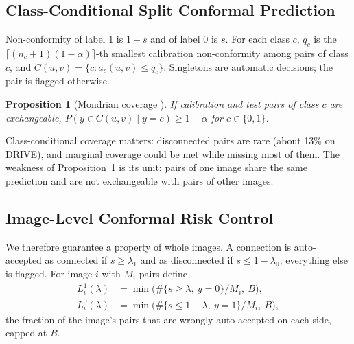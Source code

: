\documentclass[10pt,letterpaper,journal]{IEEEtran}
\newtheorem{proposition}{Proposition}
\newcommand{\1}{\mathbf{1}}
\begin{document}
\subsection{Class-Conditional Split Conformal Prediction}
Non-conformity of label 1 is $1-s$ and of label 0 is $s$. For each class $c$, $q_c$ is the $\lceil(n_c+1)(1-\alpha)\rceil$-th smallest calibration non-conformity among pairs of class $c$, and $C(u,v)=\{c: a_c(u,v)\le q_c\}$. Singletons are automatic decisions; the pair is flagged otherwise.
\begin{proposition}[Mondrian coverage \cite{vovk2005}]\label{prop:mondrian}
If calibration and test pairs of class $c$ are exchangeable, $P(y\in C(u,v)\mid y=c)\ge1-\alpha$ for $c\in\{0,1\}$.
\end{proposition}
Class-conditional coverage matters: disconnected pairs are rare (about 13\% on DRIVE), and marginal coverage could be met while missing most of them. The weakness of Proposition~\ref{prop:mondrian} is its unit: pairs of one image share the same prediction and are not exchangeable with pairs of other images.

\subsection{Image-Level Conformal Risk Control}
We therefore guarantee a property of whole images. A connection is auto-accepted as connected if $s\ge\lambda_1$ and as disconnected if $s\le1-\lambda_0$; everything else is flagged. For image $i$ with $M_i$ pairs define
\begin{align*}
L_i^{1}(\lambda)&=\min\big(\#\{s\ge\lambda,\ y=0\}/M_i,\ B\big),\\
L_i^{0}(\lambda)&=\min\big(\#\{s\le1-\lambda,\ y=1\}/M_i,\ B\big),
\end{align*}
the fraction of the image's pairs that are wrongly auto-accepted on each side, capped at $B$.
\end{document}
